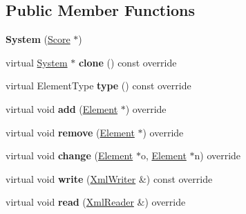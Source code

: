\subsection*{Public Member Functions}
\begin{DoxyCompactItemize}
\item 
\mbox{\label{class_ms_1_1_system_a7d002cc7b78951a724af47721bf1f762}} 
{\bfseries System} (\hyperlink{class_ms_1_1_score}{Score} $\ast$)
\item 
\mbox{\label{class_ms_1_1_system_a1a138ac5df59f8ac1fa4ed49264ff288}} 
virtual \hyperlink{class_ms_1_1_system}{System} $\ast$ {\bfseries clone} () const override
\item 
\mbox{\label{class_ms_1_1_system_a5d688901395089f7582108503bf80b9e}} 
virtual Element\+Type {\bfseries type} () const override
\item 
\mbox{\label{class_ms_1_1_system_a38215a755206cfd574aab3986d59a11c}} 
virtual void {\bfseries add} (\hyperlink{class_ms_1_1_element}{Element} $\ast$) override
\item 
\mbox{\label{class_ms_1_1_system_aaf529665602c113a229f81e888bdf06f}} 
virtual void {\bfseries remove} (\hyperlink{class_ms_1_1_element}{Element} $\ast$) override
\item 
\mbox{\label{class_ms_1_1_system_a15cd74da9edf101d3ec9b11d4921b3d9}} 
virtual void {\bfseries change} (\hyperlink{class_ms_1_1_element}{Element} $\ast$o, \hyperlink{class_ms_1_1_element}{Element} $\ast$n) override
\item 
\mbox{\label{class_ms_1_1_system_a5b462f75272a55a9f2136f07b76b38c9}} 
virtual void {\bfseries write} (\hyperlink{class_ms_1_1_xml_writer}{Xml\+Writer} \&) const override
\item 
\mbox{\label{class_ms_1_1_system_a47a6aae20c773e2ef5031b248baec08f}} 
virtual void {\bfseries read} (\hyperlink{class_ms_1_1_xml_reader}{Xml\+Reader} \&) override
\item 
\mbox{\label{class_ms_1_1_system_abe064bde12439839fa6df27bc4eb87b0}} 

\end{DoxyCompactItemize}

